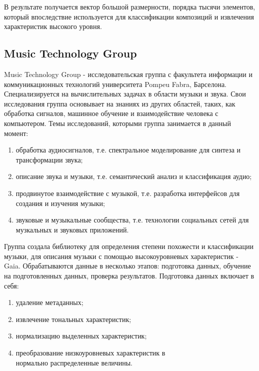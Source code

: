 В результате получается вектор большой размерности, порядка тысячи элементов, который впоследствие используется для классификации композиций и извлечения характеристик высокого уровня.

\subsection{Music Technology Group}
\label{sec:analogues:mtg}
Music Technology Group - исследовательская группа с факультета информации и коммуникационных технологий университета Pompeu Fabra, \linebreak Барселона. Специализируется на вычислительных задачах в области музыки и звука. Свои исследования группа основывает на знаниях из других областей, таких, как обработка сигналов, машинное обучение и взаимодействие человека с компьютером. Темы исследований, которыми группа занимается в данный момент:
\begin{enumerate}
    \item обработка аудиосигналов, т.е. спектральное моделирование для \linebreak синтеза и трансформации звука;
    \item описание звука и музыки, т.е. семантический анализ и классификация аудио;
    \item продвинутое взаимодействие с музыкой, т.е. разработка интерфейсов для создания и изучения музыки;
    \item звуковые и музыкальные сообщества, т.е. технологии социальных сетей для музкальных и звуковых приложений.
\end{enumerate}

Группа создала библиотеку для определения степени похожести и \linebreak классификации музыки, для описания музыки с помощью высокоуровневых характеристик - Gaia. Обрабатываются данные в несколько этапов: подготовка данных, обучение на подготовленных данных, проверка результатов.
Подготовка данных включает в себя:
\begin{enumerate}
  \item удаление метаданных;
  \item извлечение тональных характеристик;
  \item нормализацию выделенных характеристик;
  \item преобразование низкоуровневых характеристик в \\нормально распределенные величины.
\end{enumerate}

